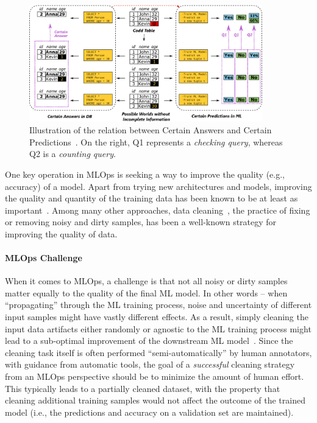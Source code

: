 \documentclass[11pt]{article}
\begin{document}
\begin{figure}[t!]
\centering
\includegraphics[width=0.9\textwidth]{submissions/data-quality-ml-ops/figs/cpclean.png}
\caption{Illustration of the relation between Certain Answers and Certain Predictions~\cite{karlavs2020nearest}. On the right, Q1 represents a \textit{checking query}, whereas Q2 is a \textit{counting query}.}
\label{fig:cpclean}
\end{figure}


\vspace{-0.5em}
One key operation in MLOps is seeking a way to 
improve the quality (e.g., accuracy) of a model.
Apart from trying new architectures and models,
improving the quality and quantity of the training
data has been known to be at least as important~\cite{li2019cleanml,fernandez2014we}.
Among many other approaches, data cleaning~\cite{ilyas2019data}, the practice of fixing 
or removing noisy and dirty samples,
has been a well-known strategy for improving 
the quality of data.

\vspace{-0.5em}
\paragraph*{MLOps Challenge}
When it comes to MLOps, a challenge is that 
not all noisy or dirty samples matter equally 
to the quality of the final ML model. In other words --
when ``propagating'' through the ML training process,
noise and uncertainty of different input samples
might have vastly different effects. As a result,
simply cleaning the input data artifacts either
randomly or agnostic to the ML 
training process might lead to a sub-optimal improvement
of the downstream ML model~\cite{li2019cleanml}.
Since the cleaning task itself is often 
performed ``semi-automatically'' 
by human annotators, with guidance from automatic
tools, the goal of a \textit{successful} cleaning strategy from an MLOps perspective should be to minimize the amount of human effort. This typically leads to a partially cleaned dataset, with the property that cleaning additional training samples would not affect the outcome of the trained model (i.e., the predictions and accuracy on a validation set are maintained).
\end{document}
